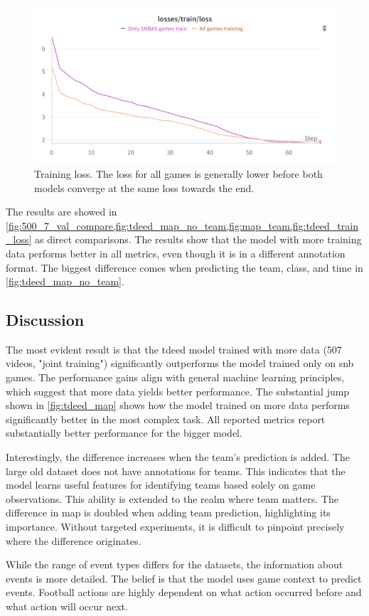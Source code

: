 \begin{figure}
    \centering
    \includegraphics[width=0.5\linewidth]{figures/tdeed_train_loss.png}
    \caption{Training loss. The loss for all games is generally lower before both models converge at the same loss towards the end. }
    \label{fig:tdeed_train_loss}
\end{figure}

The results are showed in \cref{fig:500_7_val_compare,fig:tdeed_map_no_team,fig:map_team,fig:tdeed_train_loss} as direct comparisons. The results show that the model with more training data performs better in all metrics, even though it is in a different annotation format. The biggest difference comes when predicting the team, class, and time in \cref{fig:tdeed_map_no_team}.

\subsection{Discussion}
\label{ssec:ex5_discussion}

The most evident result is that the \acrshort{tdeed} model trained with more data (507 videos, "joint training") significantly outperforms the model trained only on \acrshort{snb} games. The performance gains align with general machine learning principles, which suggest that more data yields better performance. The substantial jump shown in \cref{fig:tdeed_map} shows how the model trained on more data performs significantly better in the most complex task. All reported metrics report substantially better performance for the bigger model. 

Interestingly, the difference increases when the team's prediction is added. The large old dataset does not have annotations for teams. This indicates that the model learns useful features for identifying teams based solely on game observations. This ability is extended to the realm where team matters. The difference in \acrshort{map} is doubled when adding team prediction, highlighting its importance. Without targeted experiments, it is difficult to pinpoint precisely where the difference originates.  

While the range of event types differs for the datasets, the information about events is more detailed. The belief is that the model uses game context to predict events. Football actions are highly dependent on what action occurred before and what action will occur next. 

